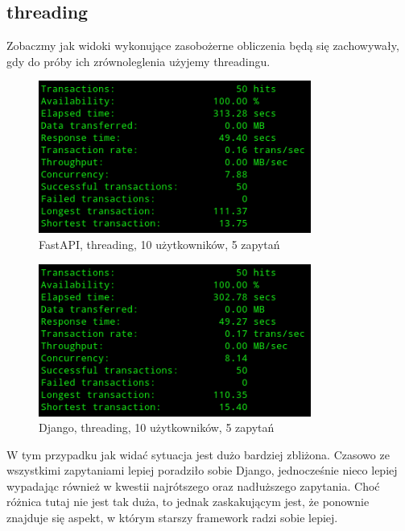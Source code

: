 \subsection{threading}
Zobaczmy jak widoki wykonujące zasobożerne obliczenia będą się zachowywały, gdy do próby ich zrównoleglenia użyjemy threadingu.
\begin{figure}[H]
    \includegraphics[height=50mm]{zdjecia/10_math_thread_fast}
    \centering
    \caption{FastAPI, threading, 10 użytkowników, 5 zapytań}
\end{figure}

\begin{figure}[H]
    \includegraphics[height=50mm]{zdjecia/10_math_thread_django}
    \centering
    \caption{Django, threading, 10 użytkowników, 5 zapytań}
\end{figure}
W tym przypadku jak widać sytuacja jest dużo bardziej zbliżona. Czasowo ze wszystkimi zapytaniami lepiej poradziło sobie Django, jednocześnie nieco lepiej wypadając również w kwestii najrótszego oraz nadłuższego zapytania. Choć różnica tutaj nie jest tak duża, to jednak zaskakującym jest, że ponownie znajduje się aspekt, w którym starszy framework radzi sobie lepiej.

